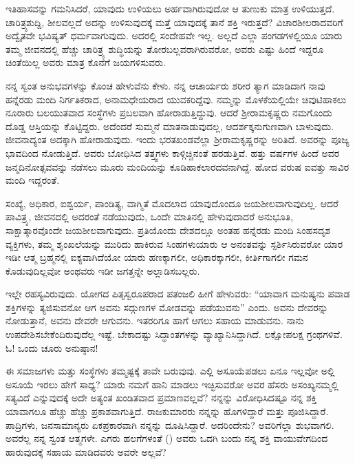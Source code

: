 \vspace{0.3cm}

ಇತಿಹಾಸವನ್ನು ಗಮನಿಸಿದರೆ, ಯಾವುದು ಉಳಿಯಲು ಅರ್ಹವಾಗಿರುವುದೋ ಆ ತುಣುಕು ಮಾತ್ರ ಉಳಿಯುತ್ತದೆ. ಚಾರಿತ್ರ್ಯಶುದ್ದಿ, ಶೀಲವಲ್ಲದೆ ಅದನ್ನು ಉಳಿಸುವುದಕ್ಕೆ ಮತ್ತೆ ಯಾವುದಕ್ಕೆ ತಾನೆ ಶಕ್ತಿ ಇರುತ್ತದೆ? ವಿಚಾರಶೀಲರಾದವರಿಗೆ ಅದ್ವೈತವೇ ಭವಿಷ್ಯತ್ ಧರ್ಮವಾಗುವುದು. ಅದರಲ್ಲಿ ಸಂದೇಹವೇ ಇಲ್ಲ. ಅಲ್ಲದೆ ಎಲ್ಲಾ ಪಂಗಡಗಳಲ್ಲಿಯೂ ಯಾರು ತಮ್ಮ ಜೀವನದಲ್ಲಿ ಹೆಚ್ಚು ಚಾರಿತ್ರ್ಯ ಶುದ್ಧಿಯನ್ನು ತೋರಬಲ್ಲವರಾಗಿರುವರೋ, ಅವರು ಎಷ್ಟು ಹಿಂದೆ ಇದ್ದರೂ ಚಿಂತೆಯಿಲ್ಲ ಅವರು ಮಾತ್ರ ಕೊನೆಗೆ ಜಯಗಳಿಸುವರು.

\vspace{0.3cm}

ನನ್ನ ಸ್ವಂತ ಅನುಭವಗಳನ್ನು ಕೊಂಚ ಹೇಳುವೆನು ಕೇಳು. ನನ್ನ ಆಚಾರ್ಯರು ಶರೀರ ತ್ಯಾಗ ಮಾಡಿದಾಗ ನಾವು ಹನ್ನೆರಡು ಮಂದಿ ನಿರ್ಗತಿಕರಾದ, ಅನಾಮಧೇಯರಾದ ಯುವಕರಿದ್ದೆವು. ನಮ್ಮನ್ನು ಮೊಳಕೆಯಲ್ಲಿಯೇ ಚಿವುಟಿಹಾಕಲು ನೂರಾರು ಬಲಯುತವಾದ ಸಂಸ್ಥೆಗಳು ಪ್ರಬಲವಾಗಿ ಹೋರಾಡುತ್ತಿದ್ದುವು. ಆದರೆ ಶ‍್ರೀರಾಮಕೃಷ್ಣರು ನಮಗೊಂದು ದೊಡ್ಡ ಆಸ್ತಿಯನ್ನು ಕೊಟ್ಟಿದ್ದರು. ಅದೆಂದರೆ ಸುಮ್ಮನೆ ಮಾತನಾಡುವುದಲ್ಲ, ಆದರ್ಶಕ್ಕನುಗುಣವಾಗಿ ಬಾಳುವುದು. ಜೀವನಾದ್ಯಂತ ಅದಕ್ಕಾಗಿ ಹೋರಾಡುವುದು. ಇಂದು ಭರತಖಂಡವೆಲ್ಲಾ ಶ‍್ರೀರಾಮಕೃಷ್ಣರನ್ನು ಅರಿತಿದೆ. ಅವರನ್ನು ಪೂಜ್ಯ ಭಾವದಿಂದ ನೋಡುತ್ತಿದೆ. ಅವರು ಬೋಧಿಸಿದ ತತ್ತ್ವಗಳು ಕಾಳ್ಗಿಚ್ಚಿನಂತೆ ಹರಡುತ್ತಿವೆ. ಹತ್ತು ವರ್ಷಗಳ ಹಿಂದೆ ಅವರ ಜನ್ಮದಿನೋತ್ಸವವನ್ನು ನಡೆಸಲು ಮೂರು ಮಂದಿಯನ್ನು ಕೂಡಿಹಾಕಲಾರದವನಾಗಿದ್ದೆ. ಹೋದ ವರುಷ ಐವತ್ತು ಸಾವಿರ ಮಂದಿ ಇದ್ದರಂತೆ.

\vspace{0.3cm}

ಸಂಖ್ಯೆ, ಅಧಿಕಾರ, ಐಶ್ವರ್ಯ, ಪಾಂಡಿತ್ಯ, ವಾಗ್ಮಿತೆ ಮೊದಲಾದ ಯಾವುದೊಂದೂ ಜಯಶೀಲವಾಗುವುದಿಲ್ಲ. ಆದರೆ ಪಾವಿತ್ರ್ಯ, ಜೀವನದಲ್ಲಿ ಅದರಂತೆ ನಡೆಯುವುದು, ಒಂದೇ ಮಾತಿನಲ್ಲಿ ಹೇಳುವುದಾದರೆ ಅನುಭೂತಿ, ಸಾಕ್ಷಾತ್ಕಾರವೊಂದೇ ಜಯಶೀಲವಾಗುವುದು. ಪ್ರತಿಯೊಂದು ದೇಶದಲ್ಲೂ ಅಂತಹ ಹನ್ನೆರಡು ಮಂದಿ ಸಿಂಹಸದೃಶ ವ್ಯಕ್ತಿಗಳು, ತಮ್ಮ ಶೃಂಖಲೆಯನ್ನು ಮುರಿದು ಹಾಕಿರುವ ಸಿಂಹಗಳು\enginline{-}ಯಾರು ಆ ಅನಂತವನ್ನು ಸ್ಪರ್ಶಿಸಿರುವರೋ ಯಾರ ಇಡೀ ಆತ್ಮ ಬ್ರಹ್ಮನಲ್ಲಿ ಐಕ್ಯವಾಗಿದೆಯೋ ಯಾರು ಹಣಕ್ಕಾಗಲೀ, ಅಧಿಕಾರಕ್ಕಾಗಲೀ, ಕೀರ್ತಿಗಾಗಲೀ ಗಮನ ಕೊಡುವುದಿಲ್ಲವೋ ಅಂಥವರು\enginline{-} ಇಡೀ ಜಗತ್ತನ್ನೇ ಅಲ್ಲಾಡಿಸಬಲ್ಲರು.

\vspace{0.3cm}

ಇಲ್ಲೇ ರಹಸ್ಯವಿರುವುದು. ಯೋಗದ ಪಿತೃಸ್ವರೂಪರಾದ ಪತಂಜಲಿ ಹೀಗೆ ಹೇಳುವರು: “ಯಾವಾಗ ಮನುಷ್ಯನು ಪವಾಡ ಶಕ್ತಿಗಳನ್ನು ತ್ಯಜಿಸುವನೋ ಆಗ ಅವನು ಸದ್ಗುಣಗಳ ಮೋಡವನ್ನು ಪಡೆಯುವನು” ಎಂದು. ಅವನು ದೇವರನ್ನು ನೋಡುತ್ತಾನೆ, ಅವನು ದೇವರೇ ಆಗುವನು. ಇತರರಿಗೂ ಹಾಗೆ ಆಗಲು ಸಹಾಯ ಮಾಡುವನು. ನಾನು ಉಪದೇಶಿಸಬೇಕೆಂದಿರುವುದೆಲ್ಲ ಇಷ್ಟೆ. ಬೇಕಾದಷ್ಟು ಸಿದ್ಧಾಂತಗಳನ್ನು ವ್ಯಾಖ್ಯಾನಿಸಿದ್ದಾಗಿದೆ. ಲಕ್ಷೋಪಲಕ್ಷ ಗ್ರಂಥಗಳಿವೆ. ಓ! ಒಂದು ಚೂರು ಅನುಷ್ಠಾನ!

\vspace{0.3cm}

ಈ ಸಮಾಜಗಳು ಮತ್ತು ಸಂಸ್ಥೆಗಳು ತಮ್ಮಷ್ಟಕ್ಕೆ ತಾವೇ ಬರುವುವು. ಎಲ್ಲಿ ಅಸೂಯೆಪಡಲು ಏನೂ ಇಲ್ಲವೋ ಅಲ್ಲಿ ಅಸೂಯೆ ಇರಲು ಹೇಗೆ ಸಾಧ್ಯ? ಯಾರು ನಮಗೆ ಹಾನಿ ಮಾಡಲು ಇಚ್ಛಿಸುವರೋ ಅವರ ಹೆಸರು ಅಸಂಖ್ಯ\enginline{-}ನಮ್ಮಲ್ಲಿ ಸತ್ಯವಿದೆ ಎನ್ನುವುದಕ್ಕೆ ಅದೇ ಅತ್ಯಂತ ಖಂಡಿತವಾದ ಪ್ರಮಾಣವಲ್ಲವೆ? ನನ್ನನ್ನು ವಿರೋಧಿಸಿದಷ್ಟೂ ನನ್ನ ಶಕ್ತಿ ಯಾವಾಗಲೂ ಹೆಚ್ಚು ಹೆಚ್ಚು ಪ್ರಕಾಶವಾಗುತ್ತಿದೆ. ರಾಜಕುಮಾರರು ನನ್ನನ್ನು ಹೊಗಳಿದ್ದಾರೆ ಮತ್ತು ಪೂಜಿಸಿದ್ದಾರೆ. ಪಾದ್ರಿಗಳು, ಜನಸಾಮಾನ್ಯರು ಏಕಪ್ರಕಾರವಾಗಿ ನನ್ನನ್ನು ದೂಷಿಸಿದ್ದಾರೆ. ಅದರಿಂದೇನು? ಅವರಿಗೆಲ್ಲಾ ಶುಭವಾಗಲಿ. ಅವರೆಲ್ಲ ನನ್ನ ಸ್ವಂತ ಆತ್ಮಗಳೇ. ಎಗರು ಹಲಗೆಗಳಂತೆ () ಅವರು ಒದಗಿ ಬಂದು ನನ್ನ ಶಕ್ತಿ ವಾಯುವೇಗದಿಂದ ಹಾರುವುದಕ್ಕೆ ಸಹಾಯ ಮಾಡಿದವರು ಅವರೇ ಅಲ್ಲವೆ?

